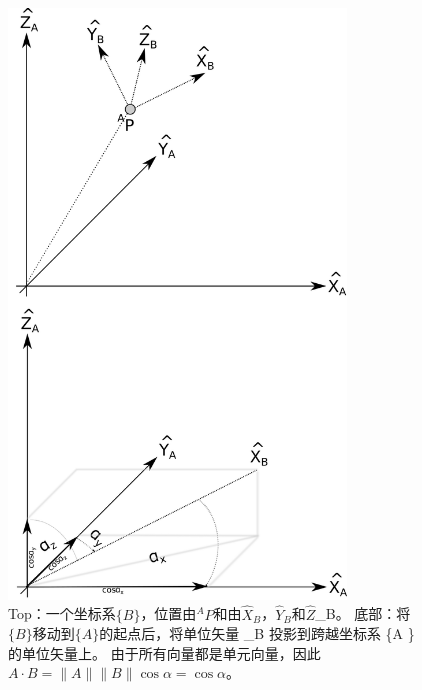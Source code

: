 \begin{figure}
	\centering
		\includegraphics[width=0.8\textwidth]{figs/projection.png}
	\caption {Top：一个坐标系$ \{B \} $，位置由$ ^ AP $和由$ \hat {X} _B $，$ \hat {Y} _B $和$ \hat {Z}$_B。 底部：将$ \{B \} $移动到$ \{A \}的起点后，将单位矢量$  _B $投影到跨越坐标系$ \{A \} $的单位矢量上$。 由于所有向量都是单元向量，因此$ A \cdot B = \| A \| \| B \| \cos \alpha = \cos \alpha $。}
	\label{fig:projection}
\end{figure}


